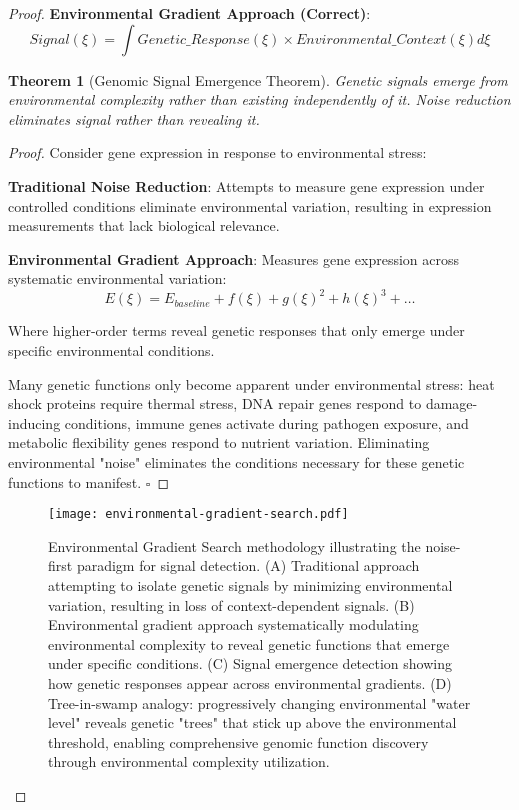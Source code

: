 \documentclass[12pt,a4paper]{article}
\newtheorem{theorem}{Theorem}[section]
\begin{document}
\begin{proof}
\textbf{Environmental Gradient Approach (Correct)}:
\begin{equation}
Signal(\xi) = \int Genetic\_Response(\xi) \times Environmental\_Context(\xi) d\xi
\end{equation}

\begin{theorem}[Genomic Signal Emergence Theorem]
Genetic signals emerge from environmental complexity rather than existing independently of it. Noise reduction eliminates signal rather than revealing it.
\end{theorem}

\begin{proof}
Consider gene expression in response to environmental stress:

\textbf{Traditional Noise Reduction}: Attempts to measure gene expression under controlled conditions eliminate environmental variation, resulting in expression measurements that lack biological relevance.

\textbf{Environmental Gradient Approach}: Measures gene expression across systematic environmental variation:
\begin{equation}
E(\xi) = E_{baseline} + f(\xi) + g(\xi)^2 + h(\xi)^3 + \ldots
\end{equation}

Where higher-order terms reveal genetic responses that only emerge under specific environmental conditions.

Many genetic functions only become apparent under environmental stress: heat shock proteins require thermal stress, DNA repair genes respond to damage-inducing conditions, immune genes activate during pathogen exposure, and metabolic flexibility genes respond to nutrient variation. Eliminating environmental "noise" eliminates the conditions necessary for these genetic functions to manifest. $\square$
\end{proof}

\begin{figure}[H]
\centering
\texttt{[image: environmental-gradient-search.pdf]}
\caption{Environmental Gradient Search methodology illustrating the noise-first paradigm for signal detection. (A) Traditional approach attempting to isolate genetic signals by minimizing environmental variation, resulting in loss of context-dependent signals. (B) Environmental gradient approach systematically modulating environmental complexity to reveal genetic functions that emerge under specific conditions. (C) Signal emergence detection showing how genetic responses appear across environmental gradients. (D) Tree-in-swamp analogy: progressively changing environmental "water level" reveals genetic "trees" that stick up above the environmental threshold, enabling comprehensive genomic function discovery through environmental complexity utilization.}
\label{fig:environmental-gradient-search}
\end{figure}




\end{proof}
\end{document}
